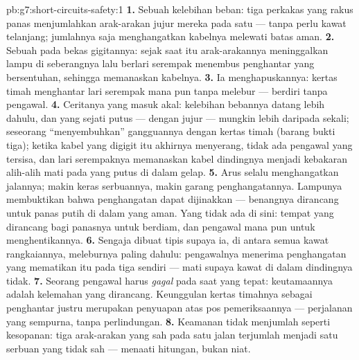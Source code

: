 \begin{solution}{pb:g7:short-circuits-safety:1}
\textbf{1.} Sebuah kelebihan beban: tiga perkakas yang rakus panas
menjumlahkan arak-arakan jujur mereka pada satu  --- tanpa perlu
kawat telanjang; jumlahnya saja menghangatkan kabelnya melewati batas
aman.
\textbf{2.} Sebuah  pada bekas gigitannya: sejak saat itu
arak-arakannya meninggalkan lampu di seberangnya lalu berlari serempak
menembus penghantar yang bersentuhan, sehingga memanaskan kabelnya.
\textbf{3.} Ia menghapuskannya: kertas timah menghantar lari serempak
mana pun tanpa melebur ---  berdiri tanpa pengawal.
\textbf{4.} Ceritanya yang masuk akal: kelebihan bebannya datang lebih
dahulu, dan  yang sejati putus --- dengan jujur --- mungkin
lebih daripada sekali; seseorang ``menyembuhkan'' gangguannya dengan
kertas timah (barang bukti tiga); ketika  kabel yang digigit
itu akhirnya menyerang, tidak ada pengawal yang tersisa, dan lari
serempaknya memanaskan kabel dindingnya menjadi kebakaran alih-alih
mati pada  yang putus di dalam gelap.
\textbf{5.} Arus selalu menghangatkan jalannya; makin keras
serbuannya, makin garang penghangatannya. Lampunya membuktikan bahwa
penghangatan dapat dijinakkan --- benangnya dirancang untuk panas putih
di dalam  yang aman. Yang tidak ada di sini: tempat yang
dirancang bagi panasnya untuk berdiam, dan pengawal mana pun untuk
menghentikannya.
\textbf{6.} Sengaja dibuat tipis supaya ia, di antara semua kawat
rangkaiannya, meleburnya paling dahulu: pengawalnya menerima
penghangatan yang mematikan itu pada tiga  sendiri ---
mati supaya  kawat di dalam dindingnya tidak.
\textbf{7.} Seorang pengawal harus \emph{gagal} pada saat yang tepat:
keutamaannya adalah kelemahan yang dirancang. Keunggulan kertas
timahnya sebagai penghantar justru merupakan penyuapan atas pos
pemeriksaannya --- perjalanan yang sempurna, tanpa perlindungan.
\textbf{8.} Keamanan tidak menjumlah seperti kesopanan: tiga
arak-arakan yang sah pada satu jalan terjumlah menjadi satu serbuan
yang tidak sah ---  menaati hitungan, bukan niat.

\end{solution}
